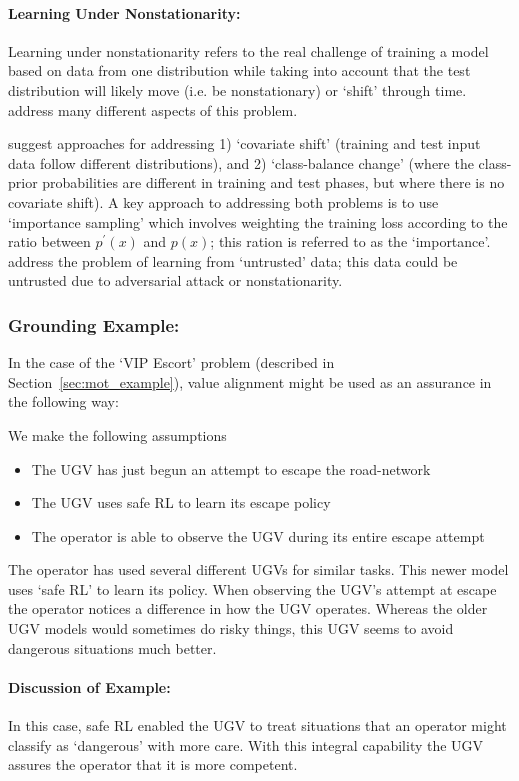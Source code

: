 \paragraph{Learning Under Nonstationarity:}
Learning under nonstationarity refers to the real challenge of training a model based on data from one distribution while taking into account that the test distribution will likely move (i.e. be nonstationary) or `shift' through time. \citet{Quinonero-Candela2009-fj} address many different aspects of this problem.

\citet{Sugiyama2013-ci} suggest approaches for addressing 1) `covariate shift' (training and test input data follow different distributions), and 2) `class-balance change' (where the class-prior probabilities are different in training and test phases, but where there is no covariate shift). A key approach to addressing both problems is to use `importance sampling' which involves weighting the training loss according to the ratio between $p^\prime(x)$ and $p(x)$; this ration is referred to as the `importance'. \citet{Charikar2017-kr} address the problem of learning from `untrusted' data; this data could be untrusted due to adversarial attack or nonstationarity.


\subsubsection{Grounding Example:}
In the case of the `VIP Escort' problem (described in Section~\ref{sec:mot_example}), value alignment might be used as an assurance in the following way:

We make the following assumptions

\begin{itemize}
    \item The UGV has just begun an attempt to escape the road-network
    \item The UGV uses safe RL to learn its escape policy
    \item The operator is able to observe the UGV during its entire escape attempt
\end{itemize}

The operator has used several different UGVs for similar tasks. This newer model uses `safe RL' to learn its policy. When observing the UGV's attempt at escape the operator notices a difference in how the UGV operates. Whereas the older UGV models would sometimes do risky things, this UGV seems to avoid dangerous situations much better. 

\paragraph{\textbf{Discussion of Example:}} In this case, safe RL enabled the UGV to treat situations that an operator might classify as `dangerous' with more care. With this integral capability the UGV assures the operator that it is more competent.
